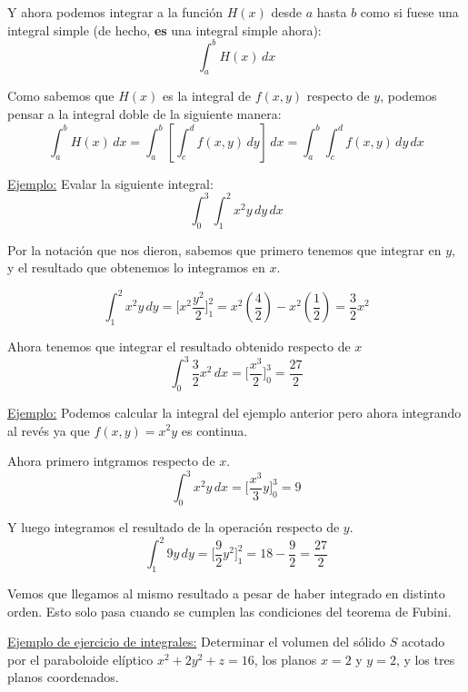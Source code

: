 \documentclass[12pt]{article}
\begin{document}
Y ahora podemos integrar a la función $ H(x) $ desde $ a $ hasta $ b $ como si fuese una integral simple (de hecho, \textbf{es} una integral simple ahora):
\[
  \int_{a}^{b} H(x) \,dx
\]

Como sabemos que $ H(x) $ es la integral de $ f(x,y) $ respecto de $ y $, podemos pensar a la integral doble de la siguiente manera:
\[
  \int_{a}^{b} H(x) \,dx = \int_{a}^{b} \left[\int_{c}^{d} f(x,y) \,dy\right] \,dx = \int_{a}^{b} \int_{c}^{d} f(x,y) \,dy\,dx
\]

\underline{Ejemplo:} Evalar la siguiente integral:
\[
  \int_{0}^{3} \int_{1}^{2} x^2y \,dy\,dx
\]

Por la notación que nos dieron, sabemos que primero tenemos que integrar en $ y $, y el resultado que obtenemos lo integramos en $ x $.

\[
  \int_{1}^{2} x^2y \,dy = \Bigg[x^2\frac{y^2}{2}\Bigg]_{1}^{2} = x^2\left(\frac{4}{2}\right) - x^2\left(\frac{1}{2}\right) = \frac{3}{2}x^2
\]

Ahora tenemos que integrar el resultado obtenido respecto de $ x $
\[
  \int_{0}^{3} \frac{3}{2}x^2 \,dx = \Bigg[\frac{x^3}{2}\Bigg]_{0}^{3}=\frac{27}{2}
\]

\vspace{0.2cm}
\vspace{0.2cm}

\underline{Ejemplo:} Podemos calcular la integral del ejemplo anterior pero ahora integrando al revés ya que $ f(x,y)=x^2y $ es continua.

Ahora primero intgramos respecto de $ x $.
\[
  \int_{0}^{3} x^2y \,dx = \Bigg[\frac{x^3}{3}y\Bigg]_{0}^{3} = 9
\]

Y luego integramos el resultado de la operación respecto de $ y $.
\[
  \int_{1}^{2} 9y \,dy = \Bigg[\frac{9}{2}y^2\Bigg]_{1}^{2} = 18 - \frac{9}{2} = \frac{27}{2}
\]

Vemos que llegamos al mismo resultado a pesar de haber integrado en distinto orden. Esto solo pasa cuando se cumplen las condiciones del teorema de Fubini.

\underline{Ejemplo de ejercicio de integrales:} Determinar el volumen del sólido $ S $ acotado por el paraboloide elíptico $ x^2+2y^2+z=16 $, los planos $ x=2 $ y $ y=2 $, y los tres planos coordenados.
\end{document}
